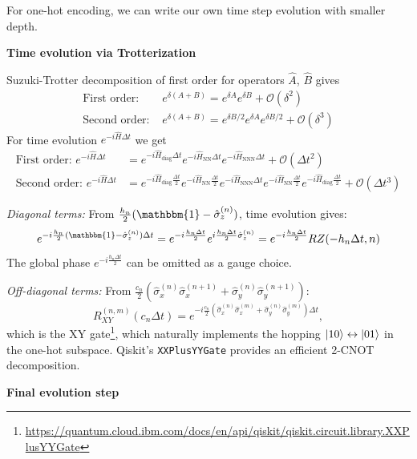 \documentclass[%
nofootinbib,
 amsmath,amssymb,
 aps,
 prd,
10pt]{revtex4-2}
\renewcommand{\O}{\mathcal{O}}
\newcommand{\Id}{\mathbbm{1}}
\renewcommand{\H}{\hat{H}} %
\begin{document}
For one-hot encoding, we can write our own time step evolution with smaller depth.

\textbf{Time evolution via Trotterization}

Suzuki-Trotter decomposition of first order for operators $\hat A$, $\hat B$ gives \cite{Hatano05}
\begin{align*}
    \text{First order: }&e^{\delta (A+B)}= e^{\delta A}e^{\delta B}+\O(\delta^2) \\
    \text{Second order: }&e^{\delta (A+B)}= e^{\delta B/2}e^{\delta A}e^{\delta B/2}+\O(\delta^3)
\end{align*} 
For time evolution $e^{-i\H \Delta t}$ we get
\begin{align}
    \text{First order: } e^{-i\H \Delta t} &= e^{-i\H_{\mathrm{diag}} \Delta t} e^{-i\H_{\mathrm{NN}} \Delta t} e^{-i\H_{\mathrm{NNN}} \Delta t} + \O(\Delta t^2)\\
     \text{Second order: }e^{-i\H \Delta t} &= e^{-i\H_{\mathrm{diag}} \frac{\Delta t}{2}} e^{-i\H_{\mathrm{NN}} \frac{\Delta t}{2}} e^{-i\H_{\mathrm{NNN}} \Delta t} e^{-i\H_{\mathrm{NN}} \frac{\Delta t}{2}} e^{-i\H_{\mathrm{diag}} \frac{\Delta t}{2}} + \O(\Delta t^3)
\end{align}


\textit{Diagonal terms:} From $\frac{h_n}{2}(\Id - \hat{\sigma}_z^{(n)})$, time evolution gives:
\begin{equation}
    e^{-i\frac{h_n}{2}(\Id - \hat{\sigma}_z^{(n)})\Delta t} = e^{-i\frac{h_n \Delta t}{2}}  e^{i\frac{h_n \Delta t}{2}\hat{\sigma}_z^{(n)}} = e^{-i\frac{h_n \Delta t}{2}}RZ(-h_n \Delta t, n)
\end{equation}
The global phase $e^{-i\frac{h_n \Delta t}{2}}$ can be omitted as a gauge choice.

\textit{Off-diagonal terms:} From $\frac{c_n}{2}(\hat{\sigma}_x^{(n)}\hat{\sigma}_x^{(n+1)} + \hat{\sigma}_y^{(n)}\hat{\sigma}_y^{(n+1)})$:
\begin{equation}
    R_{XY}^{(n,m)}(c_n \Delta t) = e^{-i\frac{c_n}{2}(\hat{\sigma}_x^{(n)}\hat{\sigma}_x^{(m)} + \hat{\sigma}_y^{(n)}\hat{\sigma}_y^{(m)})\Delta t},
\end{equation}
which is the XY gate\footnote{\url{https://quantum.cloud.ibm.com/docs/en/api/qiskit/qiskit.circuit.library.XXPlusYYGate}}, which naturally implements the hopping $\ket{10} \leftrightarrow \ket{01}$ in the one-hot subspace. Qiskit's \texttt{XXPlusYYGate} provides an efficient 2-CNOT decomposition.

\textbf{Final evolution step}
\end{document}
